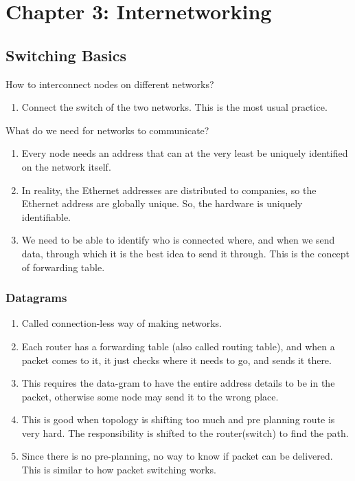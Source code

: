 \documentclass[11pt, a4paper]{article}
\begin{document}
\section{Chapter 3: Internetworking}

\subsection{Switching Basics}
How to interconnect nodes on different networks?
\begin{enumerate}
    \item Connect the switch of the two networks. This is the most usual practice.
\end{enumerate}
What do we need for networks to communicate?
\begin{enumerate}
    \item Every node needs an address that can at the very least be uniquely identified on the network itself.
    \item In reality, the Ethernet addresses are distributed to companies, so the Ethernet address are globally unique. So, the hardware is uniquely identifiable.
    \item We need to be able to identify who is connected where, and when we send data, through which it is the best idea to send it through. This is the concept of forwarding table.
\end{enumerate}

\subsubsection{Datagrams}
\begin{enumerate}
    \item Called connection-less way of making networks. 
    \item Each router has a forwarding table (also called routing table), and when a packet comes to it, it just checks where it needs to go, and sends it there. 
    \item This requires the data-gram to have the entire address details to be in the packet, otherwise some node may send it to the wrong place. 
    \item This is good when topology is shifting too much and pre planning route is very hard. The responsibility is shifted to the router(switch) to find the path. 
    \item Since there is no pre-planning, no way to know if packet can be delivered. This is similar to how packet switching works.
\end{enumerate}
\end{document}
